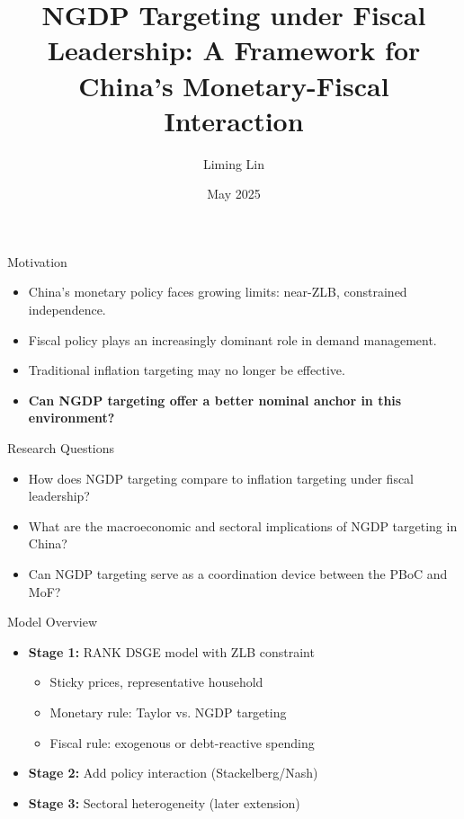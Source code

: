 \documentclass{beamer}
\title{NGDP Targeting under Fiscal Leadership: A Framework for China's Monetary-Fiscal Interaction}
\author{Liming Lin}
\institute{Sciences Po Paris}
\date{May 2025}
\begin{document}
\begin{frame}
  \titlepage
\end{frame}

\begin{frame}{Motivation}
  \begin{itemize}
    \item China's monetary policy faces growing limits: near-ZLB, constrained independence.
    \item Fiscal policy plays an increasingly dominant role in demand management.
    \item Traditional inflation targeting may no longer be effective.
    \item \textbf{Can NGDP targeting offer a better nominal anchor in this environment?}
  \end{itemize}
\end{frame}

\begin{frame}{Research Questions}
  \begin{itemize}
    \item How does NGDP targeting compare to inflation targeting under fiscal leadership?
    \item What are the macroeconomic and sectoral implications of NGDP targeting in China?
    \item Can NGDP targeting serve as a coordination device between the PBoC and MoF?
  \end{itemize}
\end{frame}

\begin{frame}{Model Overview}
  \begin{itemize}
    \item \textbf{Stage 1:} RANK DSGE model with ZLB constraint
    \begin{itemize}
      \item Sticky prices, representative household
      \item Monetary rule: Taylor vs. NGDP targeting
      \item Fiscal rule: exogenous or debt-reactive spending
    \end{itemize}
    \item \textbf{Stage 2:} Add policy interaction (Stackelberg/Nash)
    \item \textbf{Stage 3:} Sectoral heterogeneity (later extension)
  \end{itemize}
\end{frame}
\end{document}
